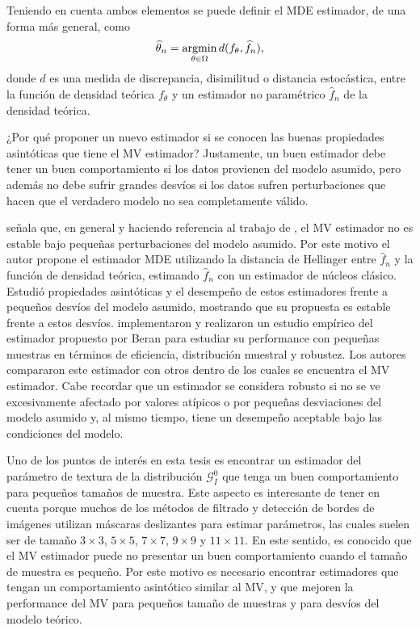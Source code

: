 %

Teniendo en cuenta ambos elementos se puede definir el MDE estimador, de una forma más general, como 
\begin{align}
\widehat{\theta}_n=\mathop{\rm argmin} \limits_{\theta\in\Omega} d(f_{\theta}, \widehat{f}_n),
\end{align}
donde $d$ es una medida de discrepancia, disimilitud o distancia estocástica, entre la función de densidad teórica $f_{\theta}$ y un estimador no paramétrico $\widehat{f}_n$ de la densidad teórica.

¿Por qué proponer un nuevo estimador si se conocen las buenas propiedades asintóticas que tiene el MV estimador? Justamente, un buen estimador debe tener un buen comportamiento si los datos provienen del modelo asumido, pero además no debe sufrir grandes desvíos si los datos sufren perturbaciones que hacen que el verdadero modelo no sea completamente válido. 

\citet{beran1977} señala que, en general y haciendo referencia al trabajo de \citet{Huber1972}, el MV estimador no es estable bajo pequeñas perturbaciones del modelo asumido. Por este motivo el autor propone el estimador MDE utilizando la distancia de Hellinger entre $\widehat{f}_n$ y la función de densidad teórica, estimando $\widehat{f}_n$ con un estimador de núcleos clásico. Estudió propiedades asintóticas y el desempeño de estos estimadores frente a pequeños desvíos del modelo asumido, mostrando que su propuesta es estable frente a estos desvíos. \citet{Eslinger1990} implementaron y realizaron un estudio empírico del estimador propuesto por Beran para estudiar su performance con pequeñas muestras en términos de eficiencia, distribución muestral y robustez. Los autores compararon este estimador con otros dentro de los cuales se encuentra el MV estimador. Cabe recordar que un estimador se considera robusto si no se ve excesivamente afectado por valores atípicos o por pequeñas desviaciones del modelo asumido y, al mismo tiempo, tiene un desempeño aceptable bajo las condiciones del modelo.

Uno de los puntos de interés en esta tesis es encontrar un estimador del parámetro de  textura de la distribución $\mathcal{G}_I^{0}$ que tenga un buen comportamiento para pequeños tamaños de muestra. Este aspecto es interesante de tener en cuenta porque muchos de los métodos de filtrado y detección de bordes de imágenes utilizan máscaras deslizantes para estimar parámetros, las cuales suelen ser de tamaño $3 \times 3$, $5 \times 5$, $7 \times 7$, $9 \times 9$ y $11 \times 11$. 
En este sentido, es conocido que el MV estimador puede no presentar un buen comportamiento cuando el tamaño de muestra es pequeño. 
Por este motivo es necesario encontrar estimadores que tengan un comportamiento asintótico similar al MV, y que mejoren la performance del MV para pequeños tamaño de muestras y para desvíos del modelo teórico.

